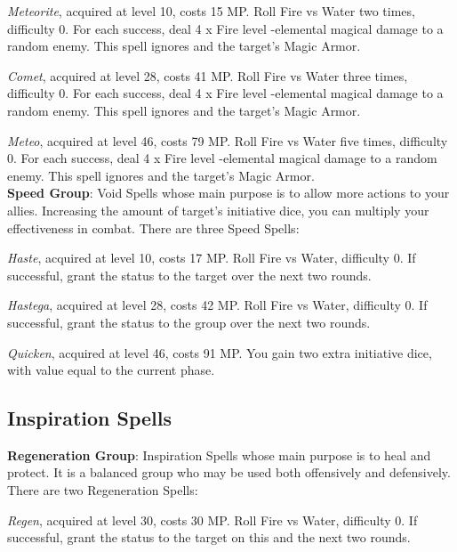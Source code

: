 \begin{multicols}{2}
    \textit{Meteorite}, acquired at level 10, costs 15 MP\@. Roll Fire vs Water two times, difficulty 0. For each success, deal 4 x Fire level -elemental magical damage to a random enemy. This spell ignores  and the target’s Magic Armor.
    
    \textit{Comet}, acquired at level 28, costs 41 MP\@. Roll Fire vs Water three times, difficulty 0. For each success, deal 4 x Fire level -elemental magical damage to a random enemy. This spell ignores  and the target’s Magic Armor.
    
    \textit{Meteo}, acquired at level 46, costs 79 MP\@. Roll Fire vs Water five times, difficulty 0. For each success, deal 4 x Fire level -elemental magical damage to a random enemy. This spell ignores  and the target’s Magic Armor.\\%
    
    \textbf{Speed Group}: Void Spells whose main purpose is to allow more actions to your allies. Increasing the amount of target’s initiative dice, you can multiply your effectiveness in combat. There are three Speed Spells:
    
    \textit{Haste}, acquired at level 10, costs 17 MP\@. Roll Fire vs Water, difficulty 0. If successful, grant the  status to the target over the next two rounds.
    
    \textit{Hastega}, acquired at level 28, costs 42 MP\@. Roll Fire vs Water, difficulty 0. If successful, grant the  status to the group over the next two rounds.
    
    \textit{Quicken}, acquired at level 46, costs 91 MP\@. You gain two extra initiative dice, with value equal to the current phase.
    
    \subsection{Inspiration Spells}\label{subsec:time-inspiration}

    \textbf{Regeneration Group}: Inspiration Spells whose main purpose is to heal and protect. It is a balanced group who may be used both offensively and defensively. There are two Regeneration Spells:
    
    \textit{Regen}, acquired at level 30, costs 30 MP\@. Roll Fire vs Water, difficulty 0. If successful, grant the  status to the target on this and the next two rounds.
    

\end{multicols}
